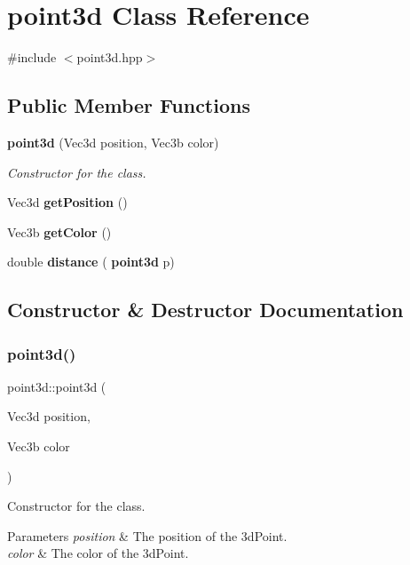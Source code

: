 \section{point3d Class Reference}
\label{classpoint3d}


{\ttfamily \#include $<$point3d.\+hpp$>$}

\subsection*{Public Member Functions}
\begin{DoxyCompactItemize}
\item 
\textbf{ point3d} (Vec3d position, Vec3b color)
\begin{DoxyCompactList}\small\item\em Constructor for the class. \end{DoxyCompactList}\item 
Vec3d \textbf{ get\+Position} ()
\item 
Vec3b \textbf{ get\+Color} ()
\item 
double \textbf{ distance} (\textbf{ point3d} p)
\end{DoxyCompactItemize}


\subsection{Constructor \& Destructor Documentation}
\mbox{\label{classpoint3d_a92ab5430456c0738bdc7d8f9f623629a}} 
\subsubsection{point3d()}
{\footnotesize\ttfamily point3d\+::point3d (\begin{DoxyParamCaption}\item[{Vec3d}]{position,  }\item[{Vec3b}]{color }\end{DoxyParamCaption})}



Constructor for the class. 


\begin{DoxyParams}{Parameters}
{\em position} & The position of the 3d\+Point. \\
\hline
{\em color} & The color of the 3d\+Point. \\
\hline
\end{DoxyParams}


